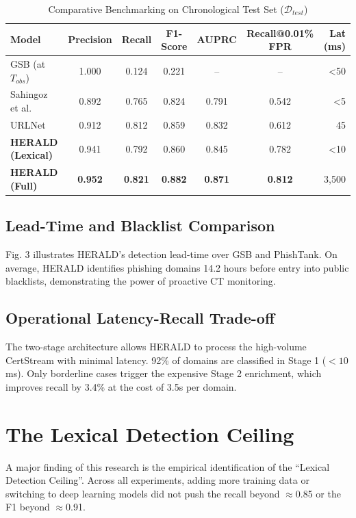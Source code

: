 \documentclass[journal]{IEEEtran}
\begin{document}
\begin{table}[t]
\centering
\caption{Comparative Benchmarking on Chronological Test Set ($\mathcal{D}_{test}$)}
\begin{tabular}{lcccccr}
\toprule
\textbf{Model} & \textbf{Precision} & \textbf{Recall} & \textbf{F1-Score} & \textbf{AUPRC} & \textbf{Recall@0.01\% FPR} & \textbf{Lat (ms)} \\
\midrule
GSB (at $T_{obs}$) & 1.000 & 0.124 & 0.221 & -- & -- & <50 \\
Sahingoz et al. \cite{sahingoz2019} & 0.892 & 0.765 & 0.824 & 0.791 & 0.542 & <5 \\
URLNet \cite{le2018} & 0.912 & 0.812 & 0.859 & 0.832 & 0.612 & 45 \\
\midrule
\textbf{HERALD (Lexical)} & 0.941 & 0.792 & 0.860 & 0.845 & 0.782 & <10 \\
\textbf{HERALD (Full)} & \textbf{0.952} & \textbf{0.821} & \textbf{0.882} & \textbf{0.871} & \textbf{0.812} & 3,500 \\
\bottomrule
\end{tabular}
\end{table}

\subsection{Lead-Time and Blacklist Comparison}
Fig. 3 illustrates HERALD's detection lead-time over GSB and PhishTank. On average, HERALD identifies phishing domains 14.2 hours before entry into public blacklists, demonstrating the power of proactive CT monitoring.

\subsection{Operational Latency-Recall Trade-off}
The two-stage architecture allows HERALD to process the high-volume CertStream with minimal latency. 92\% of domains are classified in Stage 1 ($<10$ms). Only borderline cases trigger the expensive Stage 2 enrichment, which improves recall by 3.4\% at the cost of 3.5s per domain.

\section{The Lexical Detection Ceiling}
A major finding of this research is the empirical identification of the ``Lexical Detection Ceiling''. Across all experiments, adding more training data or switching to deep learning models did not push the recall beyond $\approx$0.85 or the F1 beyond $\approx$0.91. 
\end{document}
